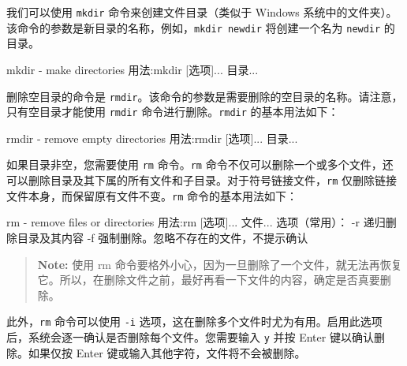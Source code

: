 
我们可以使用 \texttt{mkdir} 命令来创建文件目录（类似于 Windows 系统中的文件夹）。该命令的参数是新目录的名称，例如，\texttt{mkdir\ newdir} 将创建一个名为 \texttt{newdir} 的目录。

\begin{CodeBlock}[language=BookShell]
mkdir - make directories
用法:mkdir [选项]... 目录...
\end{CodeBlock}

删除空目录的命令是 \texttt{rmdir}。该命令的参数是需要删除的空目录的名称。请注意，只有空目录才能使用 \texttt{rmdir} 命令进行删除。\texttt{rmdir} 的基本用法如下：

\begin{CodeBlock}[language=BookShell]
rmdir - remove empty directories
用法:rmdir [选项]... 目录...
\end{CodeBlock}

如果目录非空，您需要使用 \texttt{rm} 命令。\texttt{rm} 命令不仅可以删除一个或多个文件，还可以删除目录及其下属的所有文件和子目录。对于符号链接文件，\texttt{rm} 仅删除链接文件本身，而保留原有文件不变。\texttt{rm} 命令的基本用法如下：

\begin{CodeBlock}[language=BookShell]
rm - remove files or directories
用法:rm [选项]... 文件...
选项（常用）：
	-r 递归删除目录及其内容
	-f 强制删除。忽略不存在的文件，不提示确认
\end{CodeBlock}

\begin{quote}
\textbf{Note:} 使用 rm 命令要格外小心，因为一旦删除了一个文件，就无法再恢复它。所以，在删除文件之前，最好再看一下文件的内容，确定是否真要删除。
\end{quote}

此外，\texttt{rm} 命令可以使用 \texttt{-i} 选项，这在删除多个文件时尤为有用。启用此选项后，系统会逐一确认是否删除每个文件。您需要输入 \texttt{y} 并按 Enter 键以确认删除。如果仅按 Enter 键或输入其他字符，文件将不会被删除。

